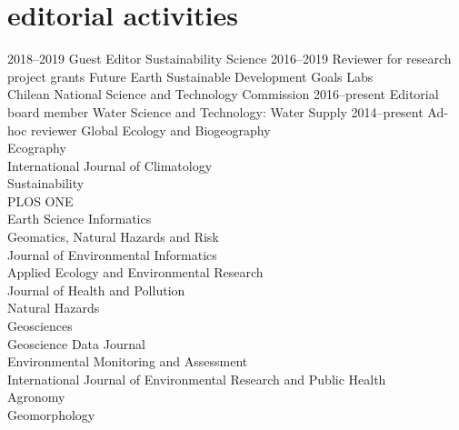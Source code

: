 \documentclass[]{friggeri-cv} %
\begin{document}
\newpage
\section{editorial activities}

\begin{entrylist}
\entry
{\small{2018--2019}}
{Guest Editor}
{}
{Sustainability Science}
\entry
{\small{2016--2019}}
{Reviewer for research project grants}
{}
{Future Earth Sustainable Development Goals Labs\\
Chilean National Science and Technology Commission}
\entry
{\small{2016--present}}
{Editorial board member}
{}
{Water Science and Technology: Water Supply}
\entry
{\small{2014--present}}
{Ad-hoc reviewer}
{}
{Global Ecology and Biogeography\\
Ecography\\
International Journal of Climatology\\
Sustainability\\
PLOS ONE\\
Earth Science Informatics\\
Geomatics, Natural Hazards and Risk\\
Journal of Environmental Informatics\\
Applied Ecology and Environmental Research\\
Journal of Health and Pollution\\
Natural Hazards\\
Geosciences\\
Geoscience Data Journal\\
Environmental Monitoring and Assessment\\
International Journal of Environmental Research and Public Health\\
Agronomy\\
Geomorphology}

\end{entrylist}

\end{document}
